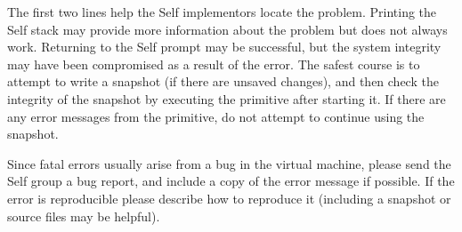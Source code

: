 \documentclass[letterpaper,10pt,english]{sphinxmanual}
\begin{document}
The first two lines help the Self implementors locate the problem. Printing the Self stack may
provide more information about the problem but does not always work. Returning to the Self
prompt may be successful, but the system integrity may have been compromised as a result of the
error. The safest course is to attempt to write a snapshot (if there are unsaved changes), and then
check the integrity of the snapshot by executing the primitive  after starting it. If there are
any error messages from the primitive, do not attempt to continue using the snapshot.

Since fatal errors usually arise from a bug in the virtual machine, please send the Self group a bug
report, and include a copy of the error message if possible. If the error is reproducible please describe
how to reproduce it (including a snapshot or source files may be helpful).

\end{document}
